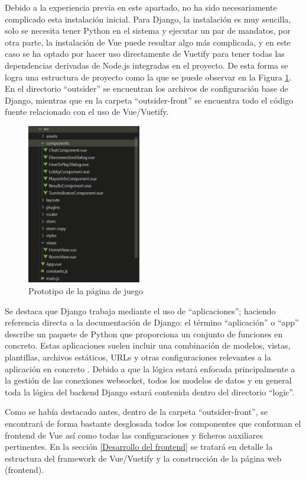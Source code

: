 Debido a la experiencia previa en este apartado, no ha sido necesariamente complicado esta instalación inicial. Para Django,
la instalación es muy sencilla, solo se necesita tener Python en el sistema y ejecutar un par de mandatos, por otra parte,
la instalación de Vue puede resultar algo más complicada, y en este caso se ha optado por hacer uso directamente de Vuetify para
tener todas las dependencias derivadas de Node.js integradas en el proyecto. De esta forma se logra una estructura de proyecto
como la que se puede observar en la Figura \ref{fig:res_designJuego}. En el directorio ``outsider'' se encuentran los archivos 
de configuración base de Django, mientras que en la carpeta ``outsider-front'' se encuentra todo el código fuente relacionado 
con el uso de Vue/Vuetify.

\begin{figure}[h]
	\centering
	\includegraphics[height=7cm]{res_estructFronted.png}
	\caption{Prototipo de la página de juego}
	\label{fig:res_designJuego}
\end{figure}

Se destaca que Django trabaja mediante el uso de ``aplicaciones''; haciendo referencia directa a la documentación de Django:
el término ``aplicación'' o ``app'' describe un paquete de Python que proporciona un conjunto de funciones en concreto. 
Estas aplicaciones suelen incluir una combinación de modelos, vistas, 
plantillas, archivos estáticos, URLs y otras configuraciones relevantes a la aplicación en concreto \cite{django}. Debido a que 
la lógica estará enfocada principalmente a la gestión de las conexiones websocket, todos los modelos de datos y en general toda 
la lógica del backend Django estará contenida dentro del directorio ``logic''.

Como se había destacado antes, dentro de la carpeta ``outsider-front'', se encontrará de forma bastante desglosada todos los componentes
que conforman el frontend de Vue así como todas las configuraciones y ficheros auxiliares pertinentes. En la sección \ref{Desarrollo del frontend}
se tratará en detalle la estructura del framework de Vue/Vuetify y la construcción de la página web (frontend).

